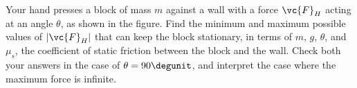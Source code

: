  Your hand presses a block of mass $m$ against a wall
with a force $\vc{F}_H$ acting at an angle $\theta $, as shown in the figure. Find the
minimum and maximum possible values of $|\vc{F}_H|$ that can keep
the block stationary, in terms of $m$, $g$, $\theta$, and
$\mu_s$, the coefficient of static friction between
the block and the wall. Check both your answers in the case of
$\theta=90\degunit$, and interpret the case where the maximum force is infinite.\answercheck
